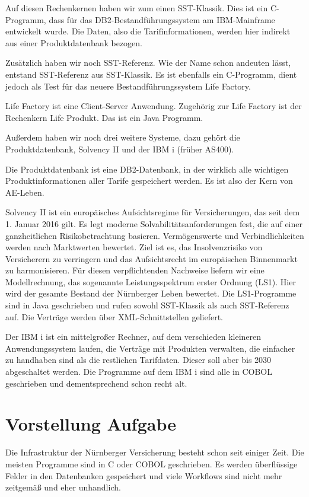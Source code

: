 Auf diesen Rechenkernen haben wir zum einen SST-Klassik. Dies ist ein C-Programm, dass für das DB2-Bestandführungssystem am IBM-Mainframe entwickelt wurde.
Die Daten, also die Tarifinformationen, werden hier indirekt aus einer Produktdatenbank bezogen.

Zusätzlich haben wir noch SST-Referenz. Wie der Name schon andeuten lässt, entstand SST-Referenz aus SST-Klassik. Es ist ebenfalls ein C-Programm, dient jedoch als Test für das neuere
Bestandführungssystem Life Factory. 

Life Factory ist eine Client-Server Anwendung. Zugehörig zur Life Factory ist der Rechenkern Life Produkt. Das ist ein Java Programm.

Außerdem haben wir noch drei weitere Systeme, dazu gehört die Produktdatenbank, Solvency II und der IBM i (früher AS400).

Die Produktdatenbank ist eine DB2-Datenbank, in der wirklich alle wichtigen Produktinformationen aller Tarife gespeichert werden. Es ist also der Kern von AE-Leben.

Solvency II ist ein europäisches Aufsichtsregime für Versicherungen, das seit dem 1. Januar 2016 gilt. Es legt moderne Solvabilitätsanforderungen fest, die auf einer ganzheitlichen Risikobetrachtung basieren. Vermögenswerte und Verbindlichkeiten werden nach Marktwerten bewertet. Ziel ist es, das Insolvenzrisiko von Versicherern zu verringern und das Aufsichtsrecht im europäischen Binnenmarkt zu harmonisieren. \cite{Bafin2016}
Für diesen verpflichtenden Nachweise liefern wir eine Modellrechnung, das sogenannte Leistungsspektrum erster Ordnung (LS1). Hier wird der gesamte Bestand der Nürnberger Leben bewertet. Die LS1-Programme sind in Java geschrieben und rufen sowohl SST-Klassik als auch SST-Referenz auf. Die Verträge werden über XML-Schnittstellen geliefert.

Der IBM i ist ein mittelgroßer Rechner, auf dem verschieden kleineren Anwendungssystem laufen, die Verträge mit Produkten verwalten, die einfacher zu handhaben sind als die restlichen Tarifdaten. Dieser soll aber bis 2030 abgeschaltet werden.
Die Programme auf dem IBM i sind alle in COBOL geschrieben und dementsprechend schon recht alt. 

\section{Vorstellung Aufgabe}
Die Infrastruktur der Nürnberger Versicherung besteht schon seit einiger Zeit. Die meisten Programme sind in C oder COBOL geschrieben.
Es werden überflüssige Felder in den Datenbanken gespeichert und viele Workflows sind nicht mehr zeitgemäß und eher unhandlich.

